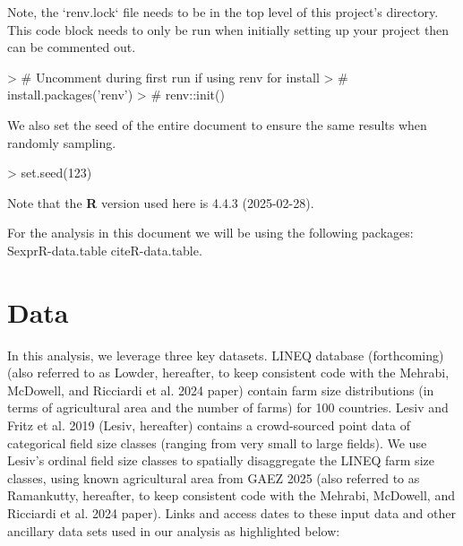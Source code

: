 \documentclass{article}
\begin{document}
Note, the `renv.lock` file needs to be in the top level of this project's directory. This code block needs to only be run when initially setting up your project then can be commented out.

\begin{Schunk}
\begin{Sinput}
> # Uncomment during first run if using renv for install
> # install.packages('renv')
> # renv::init()
\end{Sinput}
\end{Schunk}

We also set the seed of the entire document to ensure the same results when randomly sampling.

\begin{Schunk}
\begin{Sinput}
> set.seed(123)
\end{Sinput}
\end{Schunk}


Note that the \textbf{R} version used here is 4.4.3 (2025-02-28).





For the analysis in this document we will be using the following packages: Sexpr{R-data.table} cite{R-data.table}.

\section{Data}

In this analysis, we leverage three key datasets. LINEQ database (forthcoming) (also referred to as Lowder, hereafter, to keep consistent code with the Mehrabi, McDowell, and Ricciardi et al. 2024 paper) contain farm size distributions (in terms of agricultural area and the number of farms) for 100 countries. Lesiv and Fritz et al. 2019 \cite{Lesiv} (Lesiv, hereafter) contains a crowd-sourced point data of categorical field size classes (ranging from very small to large fields). We use Lesiv’s ordinal field size classes to spatially disaggregate the LINEQ farm size classes, using known agricultural area from GAEZ 2025 (also referred to as Ramankutty, hereafter, to keep consistent code with the Mehrabi, McDowell, and Ricciardi et al. 2024 paper). Links and access dates to these input data and other ancillary data sets used in our analysis as highlighted below:
\end{document}
